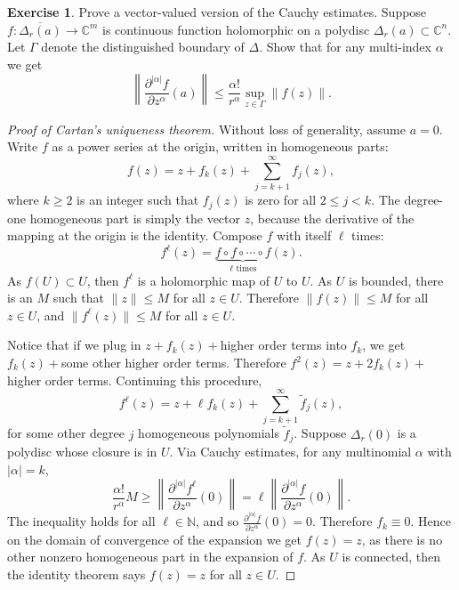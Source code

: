 \documentclass[12pt,openany]{book}
\newcommand{\sabs}[1]{\lvert {#1} \rvert}
\newcommand{\snorm}[1]{\lVert {#1} \rVert}
\newcommand{\abs}[1]{\left\lvert {#1} \right\rvert}
\newcommand{\norm}[1]{\left\lVert {#1} \right\rVert}
\newcommand{\C}{{\mathbb{C}}}
\newcommand{\N}{{\mathbb{N}}}
\theoremstyle{plain}
\theoremstyle{remark}
\theoremstyle{definition}
\newenvironment{exbox}{%
    \def\FrameCommand{\vrule width 1pt \relax\hspace {10pt}}%
    \MakeFramed {\advance \hsize -\width \FrameRestore }%
}{%
    \endMakeFramed
}
\theoremstyle{exercise}
\newtheorem{exercise}{Exercise}[section]
\theoremstyle{example}
\begin{document}
\begin{exbox}
\begin{exercise}
Prove a vector-valued version of the Cauchy estimates.  Suppose $f
\colon \overline{\Delta_r(a)} \to \C^m$ is continuous function holomorphic
on a polydisc $\Delta_r(a) \subset \C^n$.  Let $\Gamma$ denote the distinguished
boundary of $\Delta$.  Show that for any multi-index $\alpha$ we get
\begin{equation*}
\norm{\frac{\partial^{\abs{\alpha}}f}{\partial z^\alpha} (a)}
\leq
\frac{\alpha!}{r^\alpha} \sup_{z\in \Gamma} \norm{f(z)} .
\end{equation*}
\end{exercise}
\end{exbox}



\begin{proof}[Proof of Cartan's uniqueness theorem]
Without loss of generality, assume $a=0$.  Write $f$ 
as a power series at the origin, written in homogeneous parts:
\begin{equation*}
f(z) = z + f_k(z) + \sum_{j=k+1}^\infty f_j(z) ,
\end{equation*}
where $k \geq 2$ is an integer such that $f_j(z)$ is zero for all
$2 \leq j < k$.  The degree-one homogeneous part is simply the vector $z$,
because
the derivative of the mapping at the origin is the identity.
Compose $f$ with itself $\ell$ times:
\begin{equation*}
f^\ell(z) = \underbrace{f \circ f \circ \cdots \circ f}_{\ell\text{ times}}
(z) .
\end{equation*}
As $f(U) \subset U$, then $f^\ell$ is a holomorphic map
of $U$ to $U$.  As $U$ is bounded, there is an $M$ such that $\snorm{z} \leq
M$ for all $z \in U$.  Therefore $\snorm{f(z)} \leq M$ for all $z \in U$, and
$\snorm{f^\ell(z)} \leq M$ for all $z \in U$.

Notice that if we plug in $z + f_k(z) + {}$higher order terms
into $f_k$, we get $f_k(z) + {}$some other higher order terms.
Therefore $f^2(z) = z + 2 f_k(z) + {}$higher order terms.
Continuing this procedure,
\begin{equation*}
f^\ell(z) = z + \ell f_k(z) + \sum_{j=k+1}^\infty \tilde{f}_j(z) ,
\end{equation*}
for some other degree $j$ homogeneous polynomials $\tilde{f}_j$.  Suppose $\Delta_r(0)$ is a polydisc whose
closure is in $U$.
Via Cauchy estimates,
for any multinomial $\alpha$ with $\sabs{\alpha}=k$,
\begin{equation*}
\frac{\alpha!}{r^\alpha} M
\geq
\norm{\frac{\partial^{\sabs{\alpha}} f^\ell}{\partial z^\alpha}(0)}
=
\ell
\norm{\frac{\partial^{\sabs{\alpha}} f}{\partial z^\alpha}(0)} .
\end{equation*}
The inequality holds for all $\ell \in \N$, and so
$\frac{\partial^{\sabs{\alpha}} f}{\partial z^\alpha}(0) = 0$.  Therefore
$f_k \equiv 0$.  Hence on the domain of convergence of the expansion
we get $f(z) = z$, as there is no other
nonzero homogeneous part in the expansion of $f$.  As $U$ is connected,
then the identity theorem says $f(z) = z$ for all $z \in U$.
\end{proof}
\end{document}
